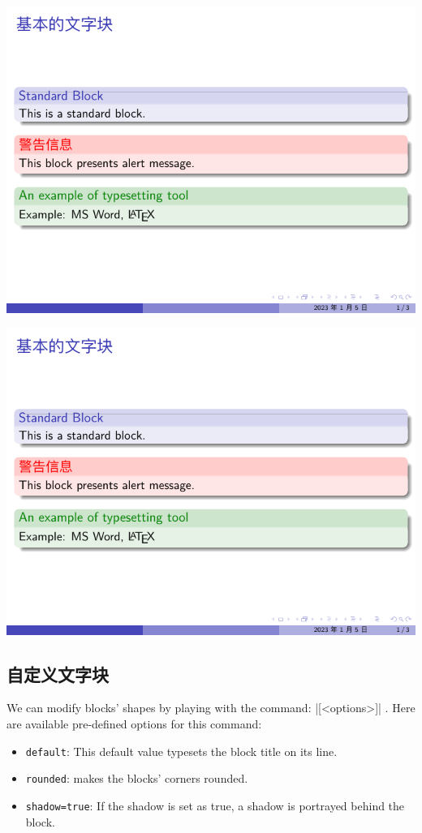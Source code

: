 \includegraphics[page=2]{examples/beamer/block-styles2.pdf}

\includegraphics[page=3]{examples/beamer/block-styles2.pdf}

\subsection{自定义文字块}

We can modify blocks’ shapes by playing with the command: 
|[<options>]|
. Here are available pre-defined options for this command:

\begin{itemize}
  \item \verb|default|: This default value typesets the block title on its line.
  \item \verb|rounded|: makes the blocks’ corners rounded.
  \item \verb|shadow=true|: If the shadow is set as true, a shadow is portrayed behind the block.
\end{itemize}

